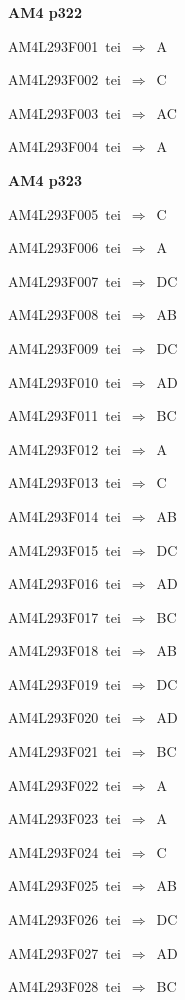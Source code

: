 \par\vfill\eject
{\bf\hfill AM4 p322\hfill\hbox{}}\par\bigskip
{\sixrm AM4L293F001\ {\sixit tei}\ }$\Rightarrow$\ A\par\smallskip
{\sixrm AM4L293F002\ {\sixit tei}\ }$\Rightarrow$\ C\par\smallskip
{\sixrm AM4L293F003\ {\sixit tei}\ }$\Rightarrow$\ AC\par\smallskip
{\sixrm AM4L293F004\ {\sixit tei}\ }$\Rightarrow$\ A\par\smallskip

\par\vfill\eject
{\bf\hfill AM4 p323\hfill\hbox{}}\par\bigskip
{\sixrm AM4L293F005\ {\sixit tei}\ }$\Rightarrow$\ C\par\smallskip
{\sixrm AM4L293F006\ {\sixit tei}\ }$\Rightarrow$\ A\par\smallskip
{\sixrm AM4L293F007\ {\sixit tei}\ }$\Rightarrow$\ DC\par\smallskip
{\sixrm AM4L293F008\ {\sixit tei}\ }$\Rightarrow$\ AB\par\smallskip
{\sixrm AM4L293F009\ {\sixit tei}\ }$\Rightarrow$\ DC\par\smallskip
{\sixrm AM4L293F010\ {\sixit tei}\ }$\Rightarrow$\ AD\par\smallskip
{\sixrm AM4L293F011\ {\sixit tei}\ }$\Rightarrow$\ BC\par\smallskip
{\sixrm AM4L293F012\ {\sixit tei}\ }$\Rightarrow$\ A\par\smallskip
{\sixrm AM4L293F013\ {\sixit tei}\ }$\Rightarrow$\ C\par\smallskip
{\sixrm AM4L293F014\ {\sixit tei}\ }$\Rightarrow$\ AB\par\smallskip
{\sixrm AM4L293F015\ {\sixit tei}\ }$\Rightarrow$\ DC\par\smallskip
{\sixrm AM4L293F016\ {\sixit tei}\ }$\Rightarrow$\ AD\par\smallskip
{\sixrm AM4L293F017\ {\sixit tei}\ }$\Rightarrow$\ BC\par\smallskip
{\sixrm AM4L293F018\ {\sixit tei}\ }$\Rightarrow$\ AB\par\smallskip
{\sixrm AM4L293F019\ {\sixit tei}\ }$\Rightarrow$\ DC\par\smallskip
{\sixrm AM4L293F020\ {\sixit tei}\ }$\Rightarrow$\ AD\par\smallskip
{\sixrm AM4L293F021\ {\sixit tei}\ }$\Rightarrow$\ BC\par\smallskip
{\sixrm AM4L293F022\ {\sixit tei}\ }$\Rightarrow$\ A\par\smallskip
{\sixrm AM4L293F023\ {\sixit tei}\ }$\Rightarrow$\ A\par\smallskip
{\sixrm AM4L293F024\ {\sixit tei}\ }$\Rightarrow$\ C\par\smallskip
{\sixrm AM4L293F025\ {\sixit tei}\ }$\Rightarrow$\ AB\par\smallskip
{\sixrm AM4L293F026\ {\sixit tei}\ }$\Rightarrow$\ DC\par\smallskip
{\sixrm AM4L293F027\ {\sixit tei}\ }$\Rightarrow$\ AD\par\smallskip
{\sixrm AM4L293F028\ {\sixit tei}\ }$\Rightarrow$\ BC\par\smallskip

